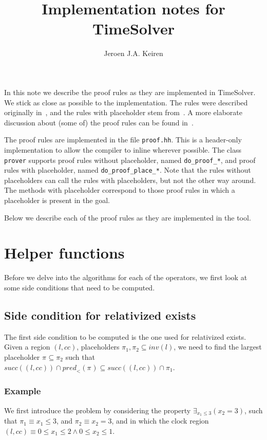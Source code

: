\documentclass{article}
\title{Implementation notes for TimeSolver}
\author{Jeroen J.A. Keiren}
\newcommand{\placeholder}[1][]{\pi_{#1}}
\newcommand{\loc}{l}
\newcommand{\region}{\mathit{cc}}
\newcommand{\suc}{\mathit{succ}}
\newcommand{\pre}{\mathit{pred}}
\newcommand{\inv}{\mathit{inv}}
\begin{document}
\maketitle


In this note we describe the proof rules as they are implemented in TimeSolver. We stick as close as possible to the implementation.
The rules were described originally in~\cite{ZC:05rtss}, and the rules with
placeholder stem from~\cite{FC:14}. A more elaborate
discussion about (some of) the proof rules can be found in~\cite{FC:14report}.

The proof rules are implemented in the file \texttt{proof.hh}. This is a header-only implementation to allow the compiler to inline wherever possible.
The class \texttt{prover} supports proof rules without placeholder, named \texttt{do\_proof\_*}, and proof rules with placeholder, named \texttt{do\_proof\_place\_*}. Note that the rules without placeholders can call the rules with placeholders, but not the other way around. The methods with placeholder correspond to those proof rules in which a placeholder is present in the goal.

Below we describe each of the proof rules as they are implemented in the tool.

\section{Helper functions}
Before we delve into the algorithms for each of the operators, we first look at some side conditions that need to be computed.

\subsection{Side condition for relativized exists}
The first side condition to be computed is the one used for relativized exists.
Given a region $(\loc, \region)$, placeholders
$\placeholder[1], \placeholder[2] \subseteq \inv(\loc)$, we need to find the
largest placeholder $\placeholder \subseteq \placeholder[2]$ such that
$\suc((\loc, \region)) \cap \pre_{<}(\placeholder) \subseteq \suc((\loc, \region)) \cap \placeholder[1]$.

\subsubsection{Example}
We first introduce the problem by considering the property $\exists_{x_1 \leq 3}(x_2 = 3)$, such that $\placeholder[1] \equiv x_1 \leq 3$, and $\placeholder[2] \equiv x_2 = 3$, and in which the clock region $(\loc, \region) \equiv 0 \leq x_1 \leq 2 \land 0 \leq x_2 \leq 1$.
\end{document}
